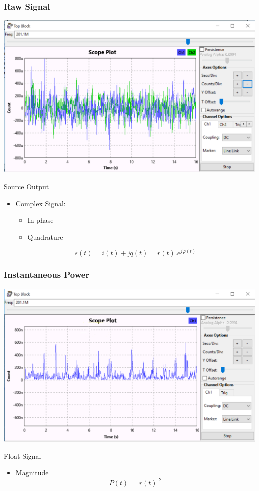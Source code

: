 \begin{frame}
	\frametitle{Raw Signal}
	\centering \includegraphics[scale=.35]{images/raw_sig.png}
	\begin{block}{Source Output}
		\begin{itemize}
			\item Complex Signal:
			\begin{itemize}
				\item In-phase 
				\item Quadrature
			\end{itemize}
			\[s(t)=i(t)+jq(t)=r(t).e^{j\varphi(t)} \]
		\end{itemize}
	\end{block}
\end{frame}

\begin{frame}
	\frametitle{Instantaneous Power}
	\centering \includegraphics[scale=.35]{images/apres_mag2.png}
	\begin{block}{Float Signal}
		\begin{itemize}
			\item Magnitude
			\[P(t)=|r(t)|^2\]
		\end{itemize}
	\end{block}
\end{frame}

